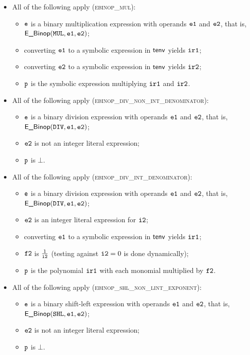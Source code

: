 \documentclass{book}
\begin{document}
\begin{itemize}
  \item All of the following apply (\textsc{ebinop\_mul}):
  \begin{itemize}
    \item $\texttt{e}$ is a binary multiplication expression with operands $\texttt{e1}$ and $\texttt{e2}$, that is, \\ $\textsf{E\_Binop}(\texttt{MUL}, \texttt{e1}, \texttt{e2})$;
    \item converting $\texttt{e1}$ to a symbolic expression in $\textsf{tenv}$ yields $\texttt{ir1}$\ProseOrTypeErrorOrBot;
    \item converting $\texttt{e2}$ to a symbolic expression in $\textsf{tenv}$ yields $\texttt{ir2}$\ProseOrTypeErrorOrBot;
    \item $\texttt{p}$ is the symbolic expression multiplying $\texttt{ir1}$ and $\texttt{ir2}$.
  \end{itemize}

  \item All of the following apply (\textsc{ebinop\_div\_non\_int\_denominator}):
  \begin{itemize}
    \item $\texttt{e}$ is a binary division expression with operands $\texttt{e1}$ and $\texttt{e2}$, that is, \\ $\textsf{E\_Binop}(\texttt{DIV}, \texttt{e1}, \texttt{e2})$;
    \item $\texttt{e2}$ is not an integer literal expression;
    \item $\texttt{p}$ is $\bot$.
  \end{itemize}

  \item All of the following apply (\textsc{ebinop\_div\_int\_denominator}):
  \begin{itemize}
    \item $\texttt{e}$ is a binary division expression with operands $\texttt{e1}$ and $\texttt{e2}$, that is, \\ $\textsf{E\_Binop}(\texttt{DIV}, \texttt{e1}, \texttt{e2})$;
    \item $\texttt{e2}$ is an integer literal expression for $\texttt{i2}$;
    \item converting $\texttt{e1}$ to a symbolic expression in $\textsf{tenv}$ yields $\texttt{ir1}$\ProseOrTypeErrorOrBot;
    \item $\texttt{f2}$ is $\frac{1}{\texttt{i2}}$ (testing against $\texttt{i2} = 0$ is done dynamically);
    \item $\texttt{p}$ is the polynomial $\texttt{ir1}$ with each monomial multiplied by $\texttt{f2}$.
  \end{itemize}

  \item All of the following apply (\textsc{ebinop\_shl\_non\_lint\_exponent}):
  \begin{itemize}
    \item $\texttt{e}$ is a binary shift-left expression with operands $\texttt{e1}$ and $\texttt{e2}$, that is, \\ $\textsf{E\_Binop}(\texttt{SHL}, \texttt{e1}, \texttt{e2})$;
    \item $\texttt{e2}$ is not an integer literal expression;
    \item $\texttt{p}$ is $\bot$.
  \end{itemize}


\end{itemize}
\end{document}
